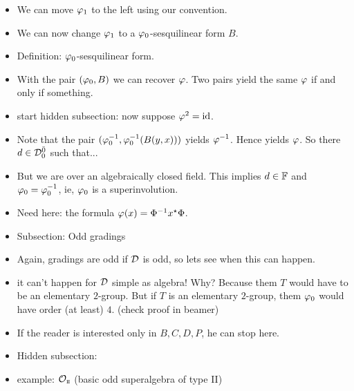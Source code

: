 \documentclass{amsbook}
\begin{document}
\begin{itemize}
        \item We can move $\varphi_1$ to the left using our convention.
        
        \item We can now change $\varphi_1$ to a $\varphi_0$-sesquilinear form $B$.
        
        \item Definition: $\varphi_0$-sesquilinear form.
        
        \item With the pair $(\varphi_0, B)$ we can recover $\varphi$. Two pairs yield the same $\varphi$ if and only if something.
        
        \item start hidden subsection: now suppose $\varphi^2 = \operatorname{id}$.
        
        \item Note that the pair $(\varphi_0^{-1}, \varphi_0^{-1} (B (y,x)))$ yields $\varphi^{-1}$. Hence yields $\varphi$. So there $d\in \mathcal{D}^{\bar0}_0$ such that...
        
        \item But we are over an algebraically closed field. This implies $d \in \mathbb{F}$ and $\varphi_0 = \varphi_0^{-1}$, ie, $\varphi_0$ is a superinvolution.
        
        \item Need here: the formula $\varphi(x) = \Phi^{-1} x^\star \Phi$.
        
        \newpage
        
        \item Subsection: Odd gradings
        
        \item Again, gradings are odd if $\mathcal{D}$ is odd, so lets see when this can happen.
        
        \item it can't happen for $\mathcal{D}$ simple as algebra! Why? Because them $T$ would have to be an elementary $2$-group. But if $T$ is an elementary $2$-group, them $\varphi_0$ would have order (at least) $4$. (check proof in beamer)
        
        \item If the reader is interested only in $B, C, D, P$, he can stop here.
        
        \item Hidden subsection:
        
        \item example: $\mathcal O_{\mathrm{\scriptscriptstyle{I\hspace{-.7pt}I}}}$ (basic odd superalgebra of type II)
        

\end{itemize}
\end{document}
